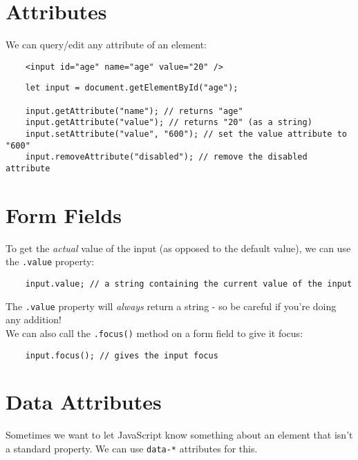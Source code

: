 \section{Attributes}

We can query/edit any attribute of an element:

\begin{verbatim}
    <input id="age" name="age" value="20" />
\end{verbatim}

\begin{verbatim}
    let input = document.getElementById("age");

    input.getAttribute("name"); // returns "age"
    input.getAttribute("value"); // returns "20" (as a string)
    input.setAttribute("value", "600"); // set the value attribute to "600"
    input.removeAttribute("disabled"); // remove the disabled attribute
\end{verbatim}


\pagebreak


\section{Form Fields}

To get the \textit{actual} value of the input (as opposed to the default value), we can use the \texttt{.value} property:

\begin{verbatim}
    input.value; // a string containing the current value of the input
\end{verbatim}

The \texttt{.value} property will \textit{always} return a string - so be careful if you're doing any addition!
\\

We can also call the \texttt{.focus()} method on a form field to give it focus:

\begin{verbatim}
    input.focus(); // gives the input focus
\end{verbatim}



\section{Data Attributes}

Sometimes we want to let JavaScript know something about an element that isn't a standard property.  We can use \texttt{data-*} attributes for this.
\\

